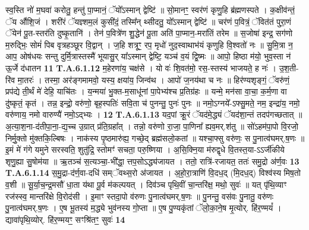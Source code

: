 \documentclass[17pt]{extarticle}
\begin{document}
                  स्व॒स्ति नो॑ म॒घवा॑ करोतु॒ हन्तु॑ पा॒प्मानं॒ ॅयो᳚ऽस्मान् द्वेष्टि॑ ॥  सो॒मानꣳ॒॒ स्वर॑णं कृणु॒हि ब्र॑ह्मणस्पते । क॒क्षीव॑न्तं॒ ॅय औ॑शि॒जं ।  शरी॑रं ॅयज्ञ्शम॒लं कुसी॑दं॒ तस्मि᳚न् थ्सीदतु॒ यो᳚ऽस्मान् द्वेष्टि॑ ॥  चर॑णं प॒वित्रं॒ ॅवित॑तं पुरा॒णं ॅयेन॑ पू॒त-स्तर॑ति दुष्कृ॒तानि॑ ।  तेन॑ प॒वित्रे॑ण शु॒द्धेन॑ पू॒ता अति॑ पा॒प्मान॒-मरा॑तिं तरेम ॥  स॒जोषा॑ इन्द्र॒ सग॑णो म॒रुद्भिः॒ सोमं॑ पिब वृत्रहञ्छूर वि॒द्वान् ।  ज॒हि शत्रूꣳ॒॒ रप॒ मृधो॑ नुद॒स्वाथाभ॑यं कृणुहि वि॒श्वतो॑ नः ॥  सु॒मि॒त्रा न॒ आप॒ ओष॑धयः सन्तु दुर्मि॒त्रास्तस्मै॑  भूयासु॒र् या᳚ऽस्मान् द्वेष्टि॒ यञ्च॑ व॒यं द्वि॒ष्मः ॥  आपो॒ हिष्ठा म॑यो॒ भुव॒स्ता न॑ ऊ॒र्जे द॑धातन \textbf{ 11} \newline
                  \newline
                                                                  \textbf{ T.A.6.1.12} \newline
                  म॒हेरणा॑य॒ चक्ष॑से । यो वः॑ शि॒वत॑मो॒ रस॒-स्तस्य॑ भाजयते॒ ह नः॑ । उ॒श॒ती-रि॑व मा॒तरः॑ । तस्मा॒ अर॑ङ्गमामवो॒ यस्य॒ क्षया॑य॒ जिन्व॑थ ।  आपो॑ ज॒नय॑था च नः ॥ हिर॑ण्यशृङ्गं॒ ॅवरु॑णं॒ प्रप॑द्ये ती॒र्थं मे॑ देहि॒ याचि॑तः ।  य॒न्मया॑ भु॒क्त-म॒साधू॑नां पा॒पेभ्य॑श्च प्र॒तिग्र॑हः ॥ यन्मे॒ मन॑सा वा॒चा॒ क॒र्म॒णा वा दु॑ष्कृतं॒ कृतं । तन्न॒ इन्द्रो॒ वरु॑णो॒ बृह॒स्पतिः॑ सवि॒ता च॑ पुनन्तु॒ पुनः॑ पुनः ॥  नमो॒ऽग्नये᳚-ऽफ्सु॒मते॒ नम॒ इन्द्रा॑य॒ नमो॒ वरु॑णाय॒ नमो वारुण्यै॑ नमो॒ऽद्भ्यः । \textbf{ 12} \newline
                  \newline
                                                                  \textbf{ T.A.6.1.13} \newline
                  यद॒पां क्रू॒रं ॅयद॑मे॒द्ध्यं ॅयद॑शा॒न्तं तदप॑गच्छतात् ॥ अ॒त्या॒श॒ना-द॑तीपा॒ना॒-द्य॒च्च उ॒ग्रात् प्र॑ति॒ग्रहा᳚त् । तन्नो॒ वरु॑णो रा॒जा॒ पा॒णिना᳚ ह्यव॒मर्.श॑तु ॥ सो॑ऽहम॑पा॒पो वि॒रजो॒ निर्मु॒क्तो मु॑क्तकि॒ल्बिषः । नाक॑स्य पृ॒ष्ठमारु॑ह्य॒ गच्छे॒द् ब्रह्म॑सलो॒कतां ॥ यश्चा॒फ्सु वरु॑णः॒ स पु॒नात्व॑घमर्.ष॒णः ॥ इ॒मं मे॑ गंगे यमुने सरस्वति॒ शुतु॑द्रि॒ स्तोमꣳ॑ सचता॒ परु॒ष्णिया ।  अ॒सि॒क्नि॒या म॑रुद्वृधे वि॒तस्त॒या-ऽऽर्जी॑कीये शृणु॒ह्या सु॒षोम॑या ॥  ऋ॒तञ्च॑ स॒त्यञ्चा॒-भी᳚द्धा॒ त्तप॒सोऽद्ध्य॑जायत ।  ततो॒ रात्रि॑-रजायत॒ ततः॑ समु॒द्रो अ॑र्ण॒वः \textbf{ 13} \newline
                  \newline
                                                                  \textbf{ T.A.6.1.14} \newline
                  स॒मु॒द्रा-द॑र्ण॒वा-दधि॑ सम्ॅवथ्स॒रो अ॑जायत ।  अ॒हो॒रा॒त्राणि॑ वि॒दध॒द् (मि॒दध॒द्) विश्व॑स्य मिष॒तो व॒शी ॥ सू॒र्या॒च॒न्द्र॒मसौ॑ धा॒ता य॑था पू॒र्व म॑कल्पयत् । दिव॑ञ्च पृथि॒वीं चा॒न्तरि॑क्ष॒ मथो॒ सुवः॑ ॥ यत् पृ॑थि॒व्याꣳ रज॑स्स्व॒ मान्तरि॑क्षे वि॒रोद॑सी । इ॒माꣳ स्तदा॒पो व॑रुणः पु॒नात्व॑घमर्.ष॒णः ॥ पु॒नन्तु॒ वस॑वः पु॒नातु॒ वरु॑णः पु॒नात्व॑घमर्.ष॒णः ।  ए॒ष भू॒तस्य॑ म॒द्ध्ये भुव॑नस्य गो॒प्ता ॥  ए॒ष पु॒ण्यकृ॑तां ॅलो॒का॒ने॒ष मृ॒त्योर्. हि॑र॒ण्मयं᳚ । द्यावा॑पृथि॒व्योर्. हि॑र॒ण्मयꣳ॒॒ सꣳश्रि॑तꣳ॒॒ सुवः॑ \textbf{ 14} \newline
\end{document}

